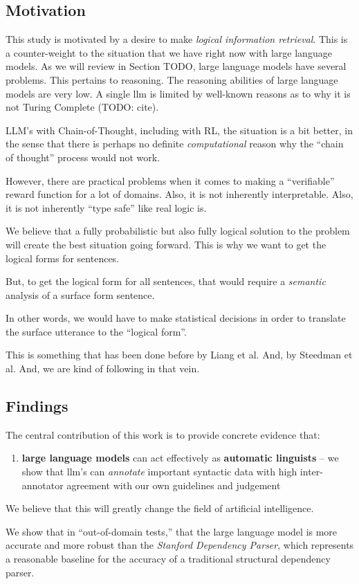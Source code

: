 \label{sec:contributions}

\subsection{Motivation}
This study is motivated by a desire to make {\em logical information retrieval}.
This is a counter-weight to the situation that we have right now with large language models.
As we will review in Section TODO, large language models have several problems.
This pertains to reasoning.
The reasoning abilities of large language models are very low.
A single llm is limited by well-known reasons as to why it is not Turing Complete (TODO: cite).

LLM's with Chain-of-Thought, including with RL, the situation is a bit better, in the sense that there is perhaps no definite {\em computational} reason why the ``chain of thought'' process would not work.

However, there are practical problems when it comes to making a ``verifiable'' reward function for a lot of domains.
Also, it is not inherently interpretable.
Also, it is not inherently ``type safe'' like real logic is.

We believe that a fully probabilistic but also fully logical solution to the problem will create the best situation going forward.
This is why we want to get the logical forms for sentences.

But, to get the logical form for all sentences, that would require a {\em semantic} analysis of a surface form sentence.

In other words, we would have to make statistical decisions in order to translate the surface utterance to the ``logical form''.

This is something that has been done before by Liang et al.
And, by Steedman et al.
And, we are kind of following in that vein.

\subsection{Findings}
The central contribution of this work is to provide concrete evidence that:
\begin{enumerate}
    \item {\bf large language models} can act effectively as {\bf automatic linguists} -- we show that llm's can {\em annotate} important syntactic data with high inter-annotator agreement with our own guidelines and judgement
\end{enumerate}
We believe that this will greatly change the field of artificial intelligence.

We show that in ``out-of-domain tests,'' that the large language model is more accurate and more robust than the {\em Stanford Dependency Parser}, which represents a reasonable baseline for the accuracy of a traditional structural dependency parser.

